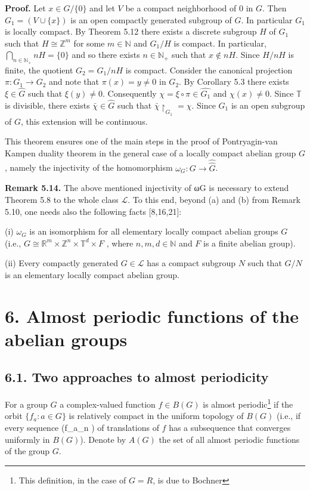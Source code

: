 \documentclass[12pt]{article}
\begin{document}
\textbf{Proof.} Let $x \in G / \{0\}$ and let $V$ be a compact neighborhood of 0 in $G$. Then $G_1 = (V \cup \{x\})$ is an open compactly generated
subgroup of $G$. In particular $G_1$ is locally compact. By Theorem 5.12 there exists a discrete subgroup $H$ of $G_1$ such that
$H \cong \mathbb{Z}^m$ for some $m \in \mathbb{N}$ and $G_1/H$ is compact. In particular, $\bigcap_{n \in \mathbb{N}_+} nH = \{0\}$ and so there exists $n \in \mathbb{N}_+$ such that $x \notin nH$.
Since $H/nH$ is finite, the quotient $G_2 = G_1/nH$ is compact. Consider the canonical projection $\pi : G_1 \to G_2$ and note that
$\pi(x) = y \neq 0$ in $G_2$. By Corollary 5.3 there exists $\xi \in \hat{G}$ such that $\xi(y) \neq 0$. Consequently $\chi = \xi \circ \pi \in \hat{G_1}$ and $\chi(x) \neq 0$.
Since $\mathbb{T}$ is divisible, there exists $\bar{\chi} \in \hat{G}$ such that $\bar{\chi}\upharpoonright_{G_1} = \chi$. Since $G_1$ is an open subgroup of $G$, this extension will be
continuous.


    This theorem ensures one of the main steps in the proof of Pontryagin-van Kampen duality theorem in the general case
of a locally compact abelian group $G$, namely the injectivity of the homomorphism $\omega_G : G \to \hat{\hat{G}}$.


\textbf{Remark 5.14.} The above mentioned injectivity of ωG is necessary to extend Theorem 5.8 to the whole class $\mathcal{L}$. To this end,
beyond (a) and (b) from Remark 5.10, one needs also the following facts [8,16,21]:


    (i) $\omega_G$ is an isomorphism for all elementary locally compact abelian groups $G$ (i.e., $G \cong \mathbb{R}^m \times \mathbb{Z}^n \times \mathbb{T}^d \times F$ , where $n,m,d \in \mathbb{N}$
and $F$ is a finite abelian group).


    (ii) Every compactly generated $G \in \mathcal{L}$ has a compact subgroup $N$ such that $G/N$ is an elementary locally compact abelian
group.


\section{6. Almost periodic functions of the abelian groups}


\subsection{6.1. Two approaches to almost periodicity}


    For a group $G$ a complex-valued function $f \in B(G)$ is almost periodic\footnote[1]{This definition, in the case of $G = R$, is due to Bochner} if the orbit $\{f_a: a \in G\}$ is relatively compact in
the uniform topology of $B(G)$ (i.e., if every sequence (f_{a_n} ) of translations of $f$ has a subsequence that converges uniformly
in $B(G)$). Denote by $A(G)$ the set of all almost periodic functions of the group $G$.
\end{document}
